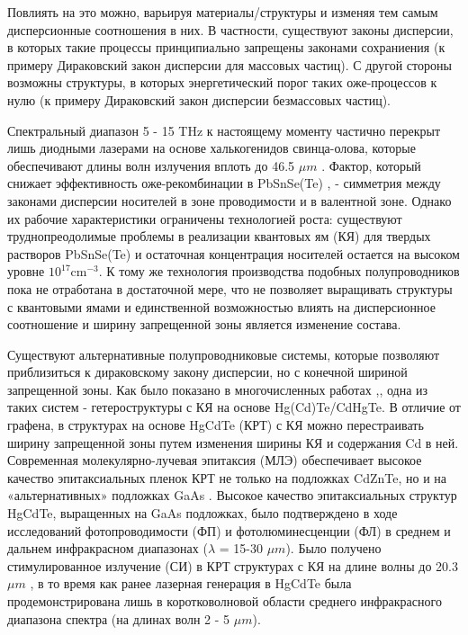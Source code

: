 \documentclass[../main.tex]{subfiles}
\begin{document}
Повлиять на это можно, варьируя материалы/структуры и изменяя тем самым дисперсионные соотношения в них. В частности,
существуют законы дисперсии, в которых такие процессы принципиально запрещены законами сохраниения (к примеру Дираковский 
закон дисперсии для массовых частиц). С другой стороны возможны структуры, в которых энергетический порог таких оже-процессов к нулю
(к примеру Дираковский закон дисперсии безмассовых частиц).

Спектральный диапазон 5 - 15 THz к настоящему моменту частично 
перекрыт лишь диодными лазерами на основе халькогенидов свинца-олова, которые обеспечивают длины 
волн излучения вплоть до 46.5 $\mu m$ \cite{Intro8}. Фактор, который снижает эффективность оже-рекомбинации в PbSnSe(Te) \cite{Intro1}, \cite{Intro9}
- симметрия между законами дисперсии носителей в зоне проводимости и в валентной зоне. Однако их рабочие характеристики 
ограничены технологией роста: существуют труднопреодолимые проблемы в реализации квантовых ям (КЯ) для твердых растворов 
PbSnSe(Te) и остаточная концентрация носителей остается на высоком уровне $10^{17} \text{cm}^{-3}$. К тому же технология производства подобных
полупроводников пока не отработана в достаточной мере, что не позволяет выращивать структуры с квантовыми ямами и единственной возможностью
влиять на дисперсионное соотношение и ширину запрещенной зоны является изменение состава.

Существуют альтернативные полупроводниковые системы, которые позволяют
приблизиться к дираковскому закону дисперсии, но с конечной шириной запрещенной зоны. 
Как было показано в многочисленных работах \cite{Rumyantsev:IOP:2018},\cite{Rumyantsev:2019}, одна из таких систем - гетероструктуры с КЯ на основе Hg(Cd)Te/CdHgTe. 
В отличие от графена, в структурах на основе HgCdTe (КРТ) с КЯ можно перестраивать ширину запрещенной зоны путем изменения ширины КЯ и 
содержания Cd в ней. Современная молекулярно-лучевая эпитаксия (МЛЭ) обеспечивает высокое качество эпитаксиальных пленок КРТ не только на подложках CdZnTe, 
но и на «альтернативных» подложках GaAs \cite{Varavin:2003}. Высокое качество эпитаксиальных структур \\HgCdTe, выращенных на GaAs подложках, было подтверждено в ходе исследований 
фотопроводимости (ФП) и фотолюминесценции (ФЛ) в среднем и дальнем инфракрасном диапазонах ($λ$ = 15-30 $\mu m$). Было получено 
стимулированное излучение (СИ) в КРТ структурах с КЯ на длине волны до 20.3 $\mu m$ \cite{Rumyantsev:IOP:2018}, в то время как ранее лазерная генерация в HgCdTe была 
продемонстрирована лишь в коротковолновой области среднего инфракрасного диапазона спектра (на длинах волн 2 - 5 $\mu m$). 
\end{document}
